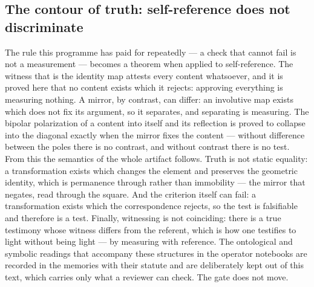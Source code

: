 \documentclass[11pt]{article}
\theoremstyle{definition}\newtheorem{deriv}{Derivation}
\begin{document}
\subsection*{The contour of truth: self-reference does not discriminate}The rule this programme has paid for repeatedly --- a check that cannot fail is not a measurement --- becomes a theorem when applied to self-reference. The witness that is the identity map attests every content whatsoever, and it is proved here that no content exists which it rejects: approving everything is measuring nothing. A mirror, by contrast, can differ: an involutive map exists which does not fix its argument, so it separates, and separating is measuring. The bipolar polarization of a content into itself and its reflection is proved to collapse into the diagonal exactly when the mirror fixes the content --- without difference between the poles there is no contrast, and without contrast there is no test. From this the semantics of the whole artifact follows. Truth is not static equality: a transformation exists which changes the element and preserves the geometric identity, which is permanence through rather than immobility --- the mirror that negates, read through the square. And the criterion itself can fail: a transformation exists which the correspondence rejects, so the test is falsifiable and therefore is a test. Finally, witnessing is not coinciding: there is a true testimony whose witness differs from the referent, which is how one testifies to light without being light --- by measuring with reference. The ontological and symbolic readings that accompany these structures in the operator notebooks are recorded in the memories with their statute and are deliberately kept out of this text, which carries only what a reviewer can check. The gate does not move.
\end{document}
